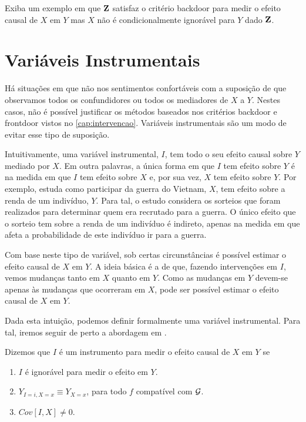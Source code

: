 \begin{exercise}
 Exiba um exemplo em que
 ${\mathbf{Z}}$ satisfaz o critério backdoor para
 medir o efeito causal de $X$ em $Y$ mas
 $X$ não é condicionalmente ignorável para $Y$ dado ${\mathbf{Z}}$.
\end{exercise}

\section{Variáveis Instrumentais}
\label{sec:instrument}

Há situações em que 
não nos sentimentos confortáveis com
a suposição de que observamos
todos os confundidores ou
todos os mediadores de $X$ a $Y$.
Nestes casos, não é possível
justificar os métodos baseados
nos critérios backdoor e frontdoor
vistos no \cref{cap:intervencao}.
Variáveis instrumentais são 
um modo de evitar esse tipo de suposição.

Intuitivamente, uma variável instrumental, $I$, tem
todo o seu efeito causal sobre $Y$ mediado por $X$.
Em outra palavras, a única forma em que $I$ tem
efeito sobre $Y$ é na medida em que 
$I$ tem efeito sobre $X$ e, por sua vez,
$X$ tem efeito sobre $Y$.
Por exemplo, \citet{Angrist1990} estuda
como participar da guerra do Vietnam, $X$, 
tem efeito sobre a renda de um indivíduo, $Y$.
Para tal, o estudo considera 
os sorteios que foram realizados para
determinar quem era recrutado para a guerra.
O único efeito que o sorteio tem
sobre a renda de um indivíduo é indireto,
apenas na medida em que afeta
a probabilidade de este indivíduo ir para a guerra.

Com base neste tipo de variável,
sob certas circunstâncias 
é possível estimar o efeito causal de $X$ em $Y$.
A ideia básica é a de que,
fazendo intervenções em $I$,
vemos mudanças tanto em $X$ quanto em $Y$.
Como as mudanças em $Y$ devem-se apenas 
às mudanças que ocorreram em $X$,
pode ser possível estimar o efeito causal de $X$ em $Y$.

Dada esta intuição, podemos
definir formalmente uma variável instrumental.
Para tal, iremos seguir de perto 
a abordagem em \citet{Angrist1996}.

\begin{definition}
 \label{def:instrument}
 Dizemos que $I$ é um instrumento para
 medir o efeito causal de $X$ em $Y$ se
 \begin{enumerate}
  \item $I$ é ignorável para medir o efeito em $Y$.
  \item $Y_{I=i,X=x} \equiv Y_{X=x}$,
  para todo $f$ compatível com ${\mathcal G}$.
  \item $Cov[I,X] \neq 0$.
 \end{enumerate}
\end{definition}

